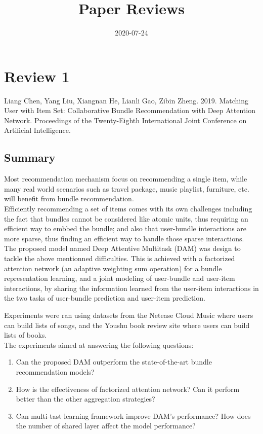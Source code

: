 \documentclass{article}
\begin{document}
\title{Paper Reviews}
\date{2020-07-24}
\maketitle

\section*{Review 1}
Liang Chen, Yang Liu, Xiangnan He, Lianli Gao, Zibin Zheng. 2019. 
Matching User with Item Set: Collaborative Bundle Recommendation with Deep 
Attention Network. 
Proceedings of the Twenty-Eighth International Joint Conference on Artificial 
Intelligence.

\subsection*{Summary}
Most recommendation mechanism focus on recommending a single item, while 
many real world scenarios such as travel package, music playlist, furniture, 
etc. will benefit from bundle recommendation.\\
Efficiently recommending a set of items comes with its own challenges including
the fact that bundles cannot be considered like atomic units, thus requiring 
an efficient way to embbed the bundle; and also that user-bundle 
interactions are more sparse, thus finding an efficient way to handle those 
sparse interactions.\\

The proposed model named Deep Attentive Multitask (DAM) was design to tackle 
the above mentionned difficulties. This is achieved with a factorized attention
network (an adaptive weighting sum operation) for a bundle representation 
learning, and a joint modeling of user-bundle and user-item interactions, by 
sharing the information learned from the user-item interactions in the two 
tasks of user-bundle prediction and user-item prediction.

Experiments were ran using datasets from the Netease Cloud Music where users 
can build lists of songs, and the Youshu book review site where users can build
lists of books.\\
The experiments aimed at answering the following questions: 
\begin{enumerate}
\item Can the proposed DAM outperform the state-of-the-art bundle 
recommendation models?
\item How is the effectiveness of factorized attention network? 
Can it perform better than the other aggregation strategies?
\item Can multi-tast learning framework improve DAM's performance? How does the number of shared layer affect the model performance?
\end{enumerate}
\end{document}
